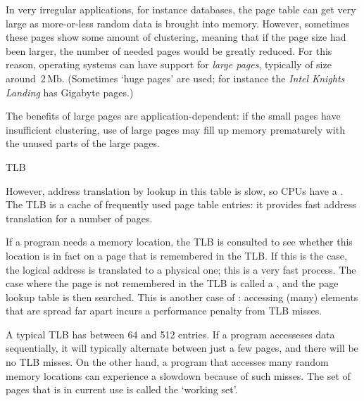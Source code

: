 
In very irregular applications, for instance databases, the page table
can get very large as more-or-less random data is brought into
memory. However, sometimes these pages show some amount of clustering,
meaning that if the page size had been larger, the number of needed
pages would be greatly reduced. For this reason, operating systems can
have support for \emph{large pages},
typically of size around~2$\,$Mb. (Sometimes `huge pages' are used; for
instance the
\emph{Intel Knights Landing}
has Gigabyte pages.)

The benefits of large pages are application-dependent: if the small
pages have insufficient clustering, use of large pages may fill up
memory prematurely with the unused parts of the large pages.

 {TLB}
\label{sec:tlb}

However, address translation by lookup in this table is slow, so \acp{CPU}
have a .
The \ac{TLB} is a cache of frequently used 
page table entries: it provides fast address translation for a number
of pages.

If a program needs a memory
location, the \ac{TLB} is consulted to see whether this location is in fact
on a page that is remembered in the \ac{TLB}. 
If this is the case, the logical address is
translated to a physical one; this is a very fast process.
The case
where the page is not remembered in the \ac{TLB} is called a
, and the page lookup table is then searched.
This is another case of :
accessing (many) elements that are spread far apart
incurs a performance penalty from \ac{TLB} misses.

A typical \ac{TLB} has between 64 and 512 entries.
If a program accesseses
data sequentially, it will typically alternate between just a few
pages, and there will be no \ac{TLB} misses.
On the other hand, a program
that accesses many random memory locations can experience a slowdown
because of such misses. The set of pages that is in current use is
called the `working set'.

